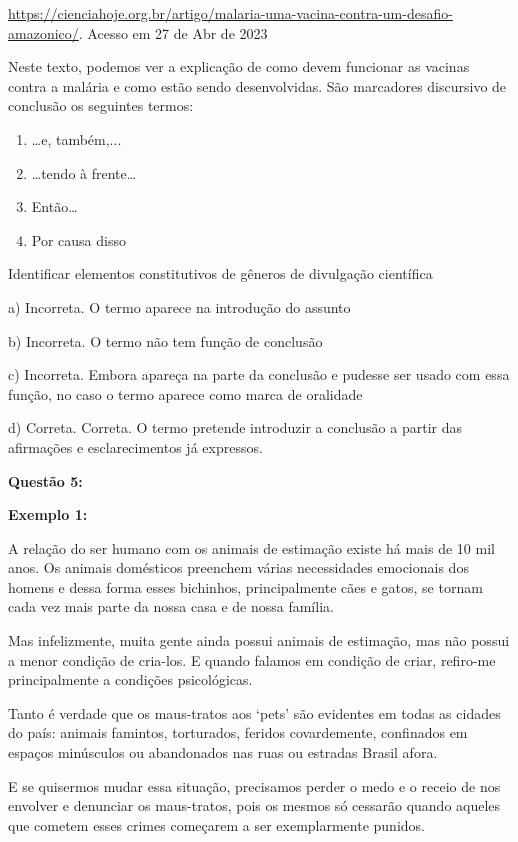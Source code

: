 \href{https://cienciahoje.org.br/artigo/malaria-uma-vacina-contra-um-desafio-amazonico/}{{https://cienciahoje.org.br/artigo/malaria-uma-vacina-contra-um-desafio-amazonico/}}.
Acesso em 27 de Abr de 2023

Neste texto, podemos ver a explicação de como devem funcionar as vacinas
contra a malária e como estão sendo desenvolvidas. São marcadores
discursivo de conclusão os seguintes termos:

\begin{enumerate}
\def\labelenumi{\alph{enumi})}
\item
  \ldots e, também,...
\item
  \ldots tendo à frente\ldots{}
\item
  Então\ldots{}
\item
  Por causa disso
\end{enumerate}

Identificar elementos constitutivos de gêneros de divulgação científica

a) Incorreta. O termo aparece na introdução do assunto

b) Incorreta. O termo não tem função de conclusão

c) Incorreta. Embora apareça na parte da conclusão e pudesse ser usado
com essa função, no caso o termo aparece como marca de oralidade

d) Correta. Correta. O termo pretende introduzir a conclusão a partir
das afirmações e esclarecimentos já expressos.

\textbf{Questão 5:}

\textbf{Exemplo 1:}

A relação do ser humano com os animais de estimação existe há mais de 10
mil anos. Os animais domésticos preenchem várias necessidades emocionais
dos homens e dessa forma esses bichinhos, principalmente cães e gatos,
se tornam cada vez mais parte da nossa casa e de nossa família.

Mas infelizmente, muita gente ainda possui animais de estimação, mas não
possui a menor condição de cria-los. E quando falamos em condição de
criar, refiro-me principalmente a condições psicológicas.

Tanto é verdade que os maus-tratos aos `pets' são evidentes em todas as
cidades do país: animais famintos, torturados, feridos covardemente,
confinados em espaços minúsculos ou abandonados nas ruas ou estradas
Brasil afora.

E se quisermos mudar essa situação, precisamos perder o medo e o receio
de nos envolver e denunciar os maus-tratos, pois os mesmos só cessarão
quando aqueles que cometem esses crimes começarem a ser exemplarmente
punidos.

